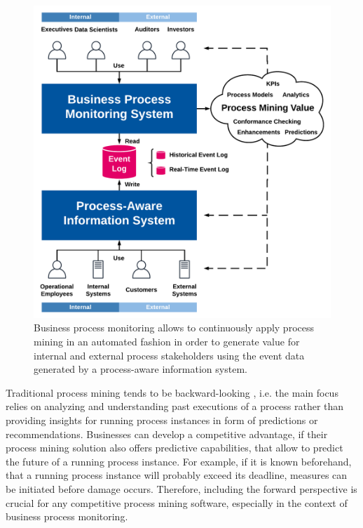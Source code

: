 \begin{figure}[htbp!]
	\centering
	\includegraphics[width=\textwidth]{figures/process-monitoring}
	\caption[Process mining in the context of business process monitoring]{Business process monitoring allows to continuously apply process mining in an automated fashion in order to generate value for internal and external process stakeholders using the event data generated by a process-aware information system.}
	\label{fig:process-monitoring}
\end{figure}

Traditional process mining tends to be backward-looking \cite{DBLP:conf/scsc/Aalst18}, i.e. the main focus relies on analyzing and understanding past executions of a process rather than providing insights for running process instances in form of predictions or recommendations.
Businesses can develop a competitive advantage, if their process mining solution also offers predictive capabilities, that allow to predict the future of a running process instance.
For example, if it is known beforehand, that a running process instance will probably exceed its deadline, measures can be initiated before damage occurs.
Therefore, including the forward perspective is crucial for any competitive process mining software, especially in the context of business process monitoring.

